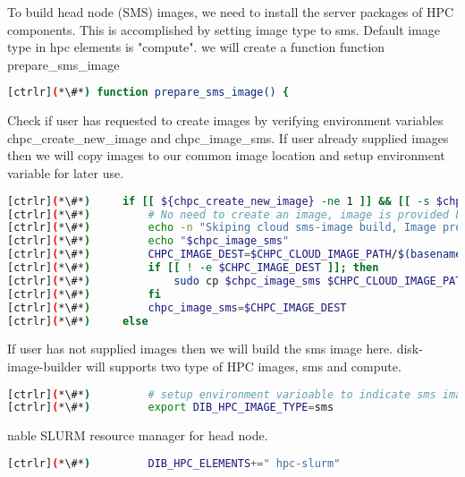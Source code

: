 	To build head node (SMS) images, we need to install the server packages of HPC components. This is accomplished by setting image type to sms. Default image type in hpc elements is "compute". we will create a function function prepare\_sms\_image

\begin{lstlisting}[language=bash,keywords={}]
[ctrlr](*\#*) function prepare_sms_image() {
\end{lstlisting} 

	Check if user has requested to create images by verifying environment variables chpc\_create\_new\_image and chpc\_image\_sms. If user already supplied images then we will copy images to our common image location and setup environment variable for later use.
	
\begin{lstlisting}[language=bash,keywords={}]
[ctrlr](*\#*)     if [[ ${chpc_create_new_image} -ne 1 ]] && [[ -s $chpc_image_sms ]]; then
[ctrlr](*\#*)         # No need to create an image, image is provided by user
[ctrlr](*\#*)         echo -n "Skiping cloud sms-image build, Image provided:"
[ctrlr](*\#*)         echo "$chpc_image_sms"
[ctrlr](*\#*)         CHPC_IMAGE_DEST=$CHPC_CLOUD_IMAGE_PATH/$(basename $chpc_image_sms)
[ctrlr](*\#*)         if [[ ! -e $CHPC_IMAGE_DEST ]]; then
[ctrlr](*\#*)             sudo cp $chpc_image_sms $CHPC_CLOUD_IMAGE_PATH
[ctrlr](*\#*)         fi
[ctrlr](*\#*)         chpc_image_sms=$CHPC_IMAGE_DEST
[ctrlr](*\#*)     else
\end{lstlisting} 

	If user has not supplied images then we will build the sms image here. disk-image-builder will supports two type of HPC images, sms and compute.  

\begin{lstlisting}[language=bash,keywords={}]
[ctrlr](*\#*)         # setup environment varioable to indicate sms image type
[ctrlr](*\#*)         export DIB_HPC_IMAGE_TYPE=sms
\end{lstlisting} 

	nable SLURM resource manager for head node.


\begin{lstlisting}[language=bash,keywords={}]
[ctrlr](*\#*)         DIB_HPC_ELEMENTS+=" hpc-slurm"
\end{lstlisting} 

